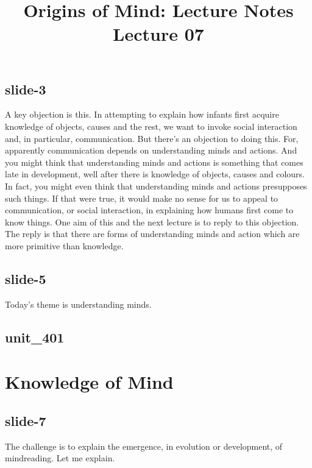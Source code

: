 \documentclass[12pt,\papersize]{extarticle}
\begin{document}
\setlength\footnotesep{1em}






\title {Origins of Mind: Lecture Notes \\ Lecture 07}
 
\maketitle
 
 
\subsection{slide-3}
A key objection is this. In attempting to explain how infants first acquire knowledge of objects, causes and the rest, we want to invoke social interaction and, in particular, communication. But there's an objection to doing this. For, apparently communication depends on understanding minds and actions. And you might think that understanding minds and actions is something that comes late in development, well after there is knowledge of objects, causes and colours. In fact, you might even think that understanding minds and actions presupposes such things. If that were true, it would make no sense for us to appeal to communication, or social interaction, in explaining how humans first come to know things.
One aim of this and the next lecture is to reply to this objection. The reply is that there are forms of understanding minds and action which are more primitive than knowledge.
 
 
\subsection{slide-5}
Today's theme is understanding minds.
 
 
\subsection{unit\_401}
 
\section{Knowledge of Mind}
 
 
\subsection{slide-7}
The challenge is to explain the emergence, in evolution or development, of mindreading.
Let me explain.
 
\end{document}
